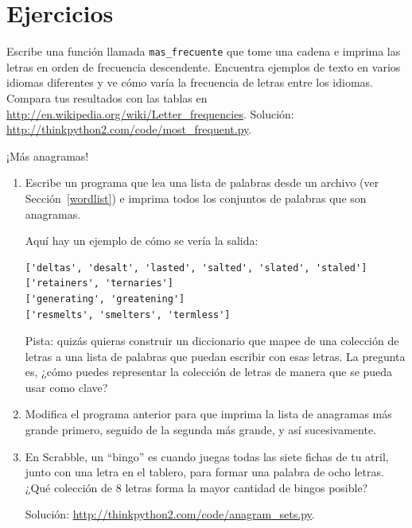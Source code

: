 \documentclass[10pt]{book}
\begin{document}
\section{Ejercicios}

\begin{exercise}

Escribe una función llamada \verb"mas_frecuente" que tome una cadena e
imprima las letras en orden de frecuencia descendente.  Encuentra ejemplos
de texto en varios idiomas diferentes y ve cómo varía la frecuencia de letras
entre los idiomas.  Compara tus resultados con las tablas en
\url{http://en.wikipedia.org/wiki/Letter_frequencies}.  Solución:
\url{http://thinkpython2.com/code/most_frequent.py}.   

\end{exercise}


\begin{exercise}
\label{anagrams}

¡Más anagramas!

\begin{enumerate}

\item Escribe un programa
que lea una lista de palabras desde un archivo (ver Sección~\ref{wordlist}) e
imprima todos los conjuntos de palabras que son anagramas.

Aquí hay un ejemplo de cómo se vería la salida:

\begin{verbatim}
['deltas', 'desalt', 'lasted', 'salted', 'slated', 'staled']
['retainers', 'ternaries']
['generating', 'greatening']
['resmelts', 'smelters', 'termless']
\end{verbatim}
%
Pista: quizás quieras construir un diccionario que mapee de una
colección de letras a una lista de palabras que puedan escribir con esas
letras.  La pregunta es, ¿cómo puedes representar la colección de
letras de manera que se pueda usar como clave?

\item Modifica el programa anterior para que imprima la lista de anagramas
más grande primero, seguido de la segunda más grande, y así sucesivamente.

\item En Scrabble, un ``bingo'' es cuando juegas todas las siete fichas de
tu atril, junto con una letra en el tablero, para formar una palabra de ocho
letras.  ¿Qué colección de 8 letras forma la mayor cantidad de bingos posible?


Solución: \url{http://thinkpython2.com/code/anagram_sets.py}.

\end{enumerate}
\end{exercise}
\end{document}
